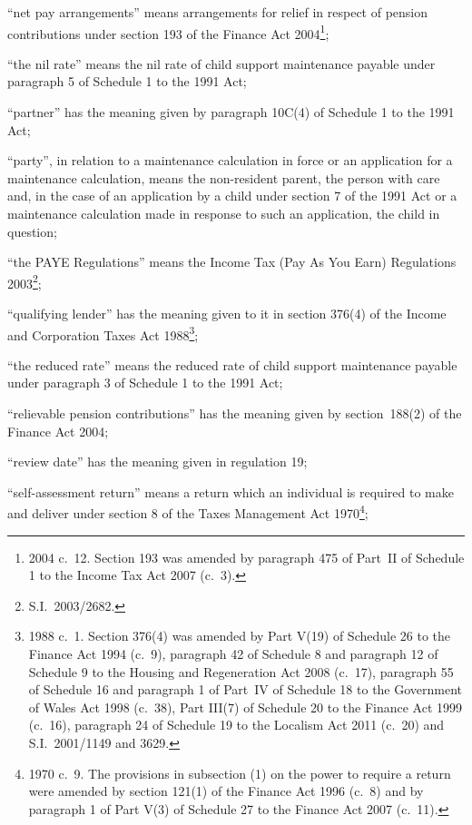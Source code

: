 \documentclass[12pt,a4paper]{article}
\begin{document}
\begin{enumerate}
“net pay arrangements” means arrangements for relief in respect of pension contributions under section 193 of the Finance Act 2004\footnote{2004 c.~12. Section 193 was amended by paragraph 475 of Part~II of Schedule 1 to the Income Tax Act 2007 (c.~3).};

“the nil rate” means the nil rate of child support maintenance payable under paragraph 5 of Schedule 1 to the 1991 Act;

“partner” has the meaning given by paragraph 10C(4) of Schedule 1 to the 1991 Act;

“party”, in relation to a maintenance calculation in force or an application for a maintenance calculation, means the non-resident parent, the person with care and, in the case of an application by a child under section 7 of the 1991 Act or a maintenance calculation made in response to such an application, the child in question;

“the PAYE Regulations” means the Income Tax (Pay As You Earn) Regulations 2003\footnote{S.I.~2003/2682.};

“qualifying lender” has the meaning given to it in section 376(4) of the Income and Corporation Taxes Act 1988\footnote{1988 c.~1. Section 376(4) was amended by Part V(19) of Schedule 26 to the Finance Act 1994 (c.~9), paragraph 42 of Schedule 8 and paragraph 12 of Schedule 9 to the Housing and Regeneration Act 2008 (c.~17), paragraph 55 of Schedule 16 and paragraph 1 of Part~IV of Schedule 18 to the Government of Wales Act 1998 (c.~38), Part III(7) of Schedule 20 to the Finance Act 1999 (c.~16), paragraph 24 of Schedule 19 to the Localism Act 2011 (c.~20) and S.I.~2001/1149 and 3629.};

“the reduced rate” means the reduced rate of child support maintenance payable under paragraph 3 of Schedule 1 to the 1991 Act;

\begin{sloppypar}
“relievable pension contributions” has the meaning given by section~188(2) of the Finance Act 2004;
\end{sloppypar}

“review date” has the meaning given in regulation 19;

“self-assessment return” means a return which an individual is required to make and deliver under section 8 of the Taxes Management Act 1970\footnote{1970 c.~9. The provisions in subsection (1) on the power to require a return were amended by section 121(1) of the Finance Act 1996 (c.~8) and by paragraph 1 of Part V(3) of Schedule 27 to the Finance Act 2007 (c.~11).};


\end{enumerate}
\end{document}
